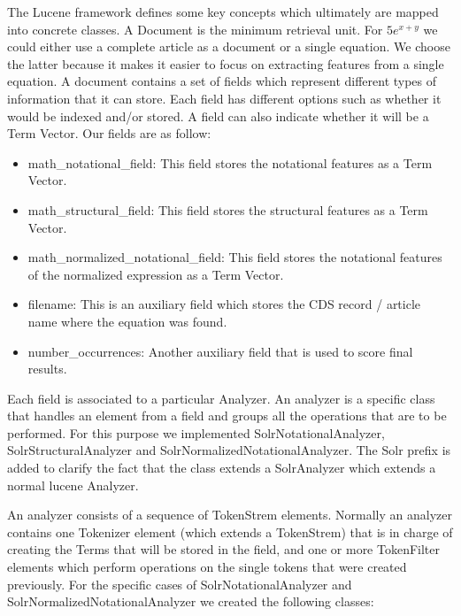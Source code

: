 The Lucene framework defines some key concepts which ultimately are mapped into concrete classes. A {\codefont Document} is the minimum retrieval unit. For $5e^{x+y}$ we could either use a complete article as a document or a single equation. We choose the latter because it makes it easier to focus on extracting features from a single equation. A document contains a set of {\codefont fields} which represent different types of information that it can store. Each field has different options such as whether it would be indexed and/or stored. A field can also indicate whether it will be a {\codefont Term Vector}. Our fields are as follow: 
\begin{itemize}
\item math\_notational\_field: This field stores the notational features as a Term Vector. 
\item math\_structural\_field: This field stores the structural features as a Term Vector. 
\item math\_normalized\_notational\_field: This field stores the notational features of the normalized expression as a Term Vector. 
\item filename: This is an auxiliary field which stores the CDS record / article name where the equation was found.
\item number\_occurrences: Another auxiliary field that is used to score final results.
\end{itemize} 

Each field is associated to a particular {\codefont Analyzer}. An analyzer is a specific class that handles an element from a field and groups all the operations that are to be performed. For this purpose we implemented {\codefont SolrNotationalAnalyzer}, {\codefont SolrStructuralAnalyzer} and {\codefont SolrNormalizedNotationalAnalyzer}. 
The Solr prefix is added to clarify the fact that the class extends a {\codefont SolrAnalyzer} which extends a normal lucene {\codefont Analyzer}. 

An analyzer consists of a sequence of {\codefont TokenStrem} elements. Normally an analyzer contains one {\codefont Tokenizer} element (which extends a {\codefont TokenStrem}) that is in charge of creating the Terms that will be stored in the field, and one or more {\codefont TokenFilter} elements which perform operations on the single tokens that were created previously. For the specific cases of SolrNotationalAnalyzer and SolrNormalizedNotationalAnalyzer we created the following classes: 

